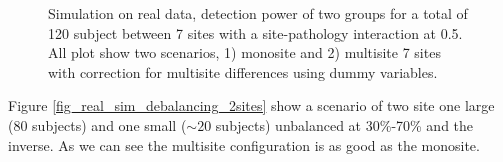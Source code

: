 \documentclass[authoryear]{elsarticle}
\begin{document}
\begin{figure}[tbp]
\centering
\captionsetup[subfloat]{labelformat=empty}
\hspace{1mm}
\hspace{1mm}
\hspace{1mm}
\caption{
Simulation on real data, detection power of two groups for a total of 120 subject between 7 sites with a site-pathology interaction at 0.5. All plot show two scenarios, 1) monosite and 2) multisite 7 sites with correction for multisite differences using dummy variables.
}
\label{fig_real_sim_debalancing_interact}
\end{figure}

Figure \ref{fig_real_sim_debalancing_2sites} show a scenario of two site one large (80 subjects) and one small ($\sim20$ subjects) unbalanced at 30\%-70\% and the inverse. As we can see the multisite configuration is as good as the monosite.
\end{document}
